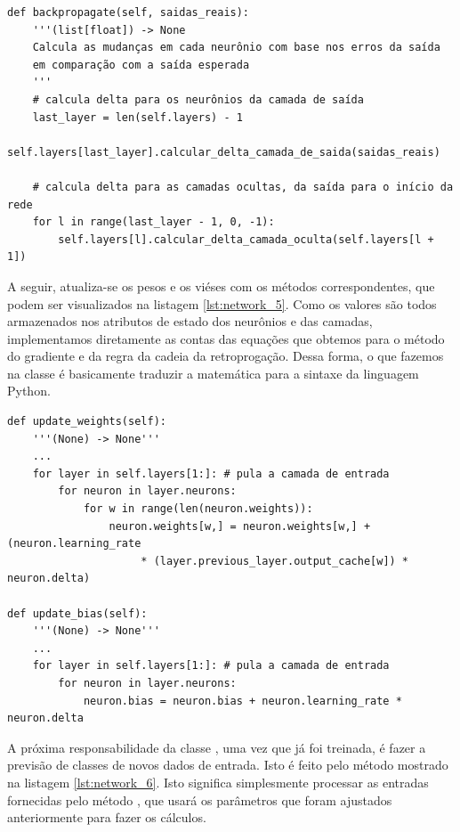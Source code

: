 \begin{scriptsize}
\estiloR
\begin{lstlisting}[caption={Trecho da classe \eng{Network}}, label={lst:network_4}, escapeinside={\%}]
def backpropagate(self, saidas_reais):
    '''(list[float]) -> None
    Calcula as mudanças em cada neurônio com base nos erros da saída
    em comparação com a saída esperada
    '''
    # calcula delta para os neurônios da camada de saída
    last_layer = len(self.layers) - 1
    self.layers[last_layer].calcular_delta_camada_de_saida(saidas_reais)
    
    # calcula delta para as camadas ocultas, da saída para o início da rede
    for l in range(last_layer - 1, 0, -1):
        self.layers[l].calcular_delta_camada_oculta(self.layers[l + 1])
\end{lstlisting}
\end{scriptsize}

A seguir, atualiza-se os pesos e os viéses com os métodos correspondentes, que podem ser visualizados na listagem \ref{lst:network_5}. Como os valores são todos armazenados nos atributos de estado dos neurônios e das camadas, implementamos diretamente as contas das equações que obtemos para o método do gradiente e da regra da cadeia da retroprogação. Dessa forma, o que fazemos na classe  é basicamente traduzir a matemática para a sintaxe da linguagem Python.

\newpage

\begin{scriptsize}
\estiloR
\begin{lstlisting}[caption={Trecho da classe \eng{Network}}, label={lst:network_5}, escapeinside={\%}]
def update_weights(self):
    '''(None) -> None'''
    ...
    for layer in self.layers[1:]: # pula a camada de entrada
        for neuron in layer.neurons:
            for w in range(len(neuron.weights)):
                neuron.weights[w,] = neuron.weights[w,] + (neuron.learning_rate
                     * (layer.previous_layer.output_cache[w]) * neuron.delta)

def update_bias(self):
    '''(None) -> None'''
    ...
    for layer in self.layers[1:]: # pula a camada de entrada
        for neuron in layer.neurons:
            neuron.bias = neuron.bias + neuron.learning_rate * neuron.delta
\end{lstlisting}
\end{scriptsize}

A próxima responsabilidade da classe , uma vez que já foi treinada, é fazer a previsão de classes de novos dados de entrada. Isto é feito pelo método mostrado na listagem \ref{lst:network_6}. Isto significa simplesmente processar as entradas fornecidas pelo método , que usará os parâmetros que foram ajustados anteriormente para fazer os cálculos. 


